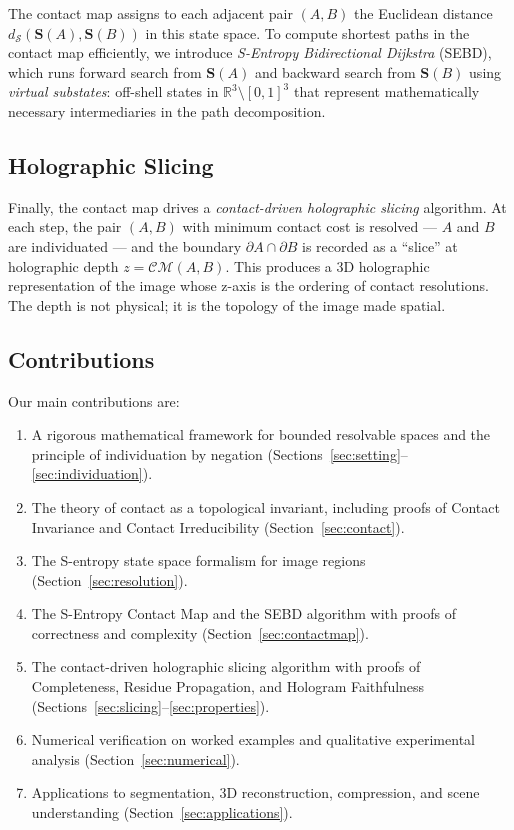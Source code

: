\documentclass[twocolumn]{article}
\theoremstyle{plain}
\theoremstyle{definition}
\newcommand{\CM}{\mathcal{CM}}
\newcommand{\bS}{\mathbf{S}}
\newcommand{\dS}{d_{\mathcal{S}}}
\newcommand{\reals}{\mathbb{R}}
\begin{document}
The contact map assigns to each adjacent pair $(A,B)$ the Euclidean distance
$\dS(\bS(A), \bS(B))$ in this state space. To compute shortest paths in the
contact map efficiently, we introduce \emph{S-Entropy Bidirectional Dijkstra}
(SEBD), which runs forward search from $\bS(A)$ and backward search from $\bS(B)$
using \emph{virtual substates}: off-shell states in $\reals^3 \setminus [0,1]^3$
that represent mathematically necessary intermediaries in the path decomposition.

\subsection{Holographic Slicing}

Finally, the contact map drives a \emph{contact-driven holographic slicing}
algorithm. At each step, the pair $(A,B)$ with minimum contact cost is resolved
--- $A$ and $B$ are individuated --- and the boundary $\partial A \cap \partial B$
is recorded as a ``slice'' at holographic depth $z = \CM(A,B)$. This produces
a 3D holographic representation of the image whose z-axis is the ordering of
contact resolutions. The depth is not physical; it is the topology of the image
made spatial.

\subsection{Contributions}

Our main contributions are:
\begin{enumerate}[label=(\roman*)]
\item A rigorous mathematical framework for bounded resolvable spaces and the
  principle of individuation by negation (Sections~\ref{sec:setting}--\ref{sec:individuation}).
\item The theory of contact as a topological invariant, including proofs of
  Contact Invariance and Contact Irreducibility (Section~\ref{sec:contact}).
\item The S-entropy state space formalism for image regions
  (Section~\ref{sec:resolution}).
\item The S-Entropy Contact Map and the SEBD algorithm with proofs of correctness
  and complexity (Section~\ref{sec:contactmap}).
\item The contact-driven holographic slicing algorithm with proofs of
  Completeness, Residue Propagation, and Hologram Faithfulness
  (Sections~\ref{sec:slicing}--\ref{sec:properties}).
\item Numerical verification on worked examples and qualitative experimental
  analysis (Section~\ref{sec:numerical}).
\item Applications to segmentation, 3D reconstruction, compression, and scene
  understanding (Section~\ref{sec:applications}).
\end{enumerate}
\end{document}
